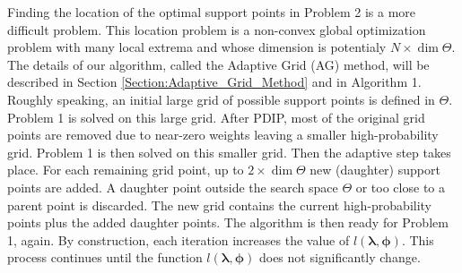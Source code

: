 Finding the  location of the optimal support points in Problem 2 is a more difficult  problem. This location problem is a non-convex global optimization problem with many local extrema and whose dimension is potentialy $N \times \dim{\Theta}$. %
%
The details of our algorithm, called the Adaptive Grid (AG) method, will be described in Section \ref{Section:Adaptive_Grid_Method} and in Algorithm 1.
%
Roughly speaking, an initial large grid of possible support points is defined in $\Theta$.
%
Problem 1 is  solved on this large grid. 
%
After PDIP, most of the original grid points are removed due to near-zero weights leaving a smaller high-probability grid.
%
Problem 1 is then solved on this smaller grid.
%
Then the adaptive step takes place.
%
For each remaining  grid point, up to $2 \times {\dim{\Theta}}$ new (daughter) support points are added.
%
A daughter point outside the search space $\Theta$ or too close to a parent point is discarded.
%
The new grid contains the current high-probability points plus the added daughter points.
%
The algorithm is then ready for Problem 1, again.
%
By construction, each iteration increases the value of $l(\bm{\lambda}, \bm{\phi})$. 
%
This process continues until the function $l(\bm{\lambda},\bm{\phi})$ does not significantly change.

%
%


